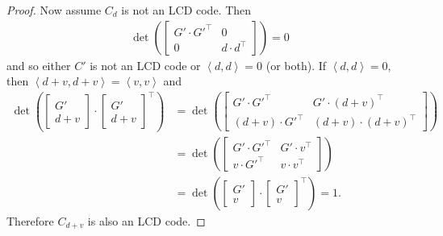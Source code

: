 \documentclass[11pt]{article}
\theoremstyle{definition}
\newcommand{\Ang}[1]{\left\langle#1\right\rangle}
\begin{document}
\begin{proof}
	Now assume $C_d$ is not an LCD code.
	Then
	\begin{align*}
		\det \left( \begin{bmatrix}
			G' \cdot G'^\top & 0 \\
			0 & d \cdot d^\top
		\end{bmatrix} \right)
		= 0
	\end{align*}
	and so either $C'$ is not an LCD code or $\Ang{d, d} = 0$ (or both).
	If $\Ang{d, d} = 0$, then $\Ang{d + v, d + v} = \Ang{v, v}$ and
	\begin{align*}
		\det \left( \begin{bmatrix}
			G' \\
			d + v
		\end{bmatrix} \cdot {\begin{bmatrix}
			G' \\
			d + v
		\end{bmatrix}}^\top \right)
		&= \det \left( \begin{bmatrix}
			G' \cdot G'^\top & G' \cdot {(d + v)}^\top \\
			(d + v) \cdot G'^\top & (d + v) \cdot {(d + v)}^\top
		\end{bmatrix} \right) \\
		&= \det \left( \begin{bmatrix}
			G' \cdot G'^\top & G' \cdot v^\top \\
			v \cdot G'^\top & v \cdot v^\top
		\end{bmatrix} \right) \\
		&= \det \left( \begin{bmatrix}
			G' \\
			v
		\end{bmatrix} \cdot {\begin{bmatrix}
			G' \\
			v
		\end{bmatrix}}^\top \right)
		= 1.
	\end{align*}
	Therefore $C_{d + v}$ is also an LCD code.


\end{proof}
\end{document}
